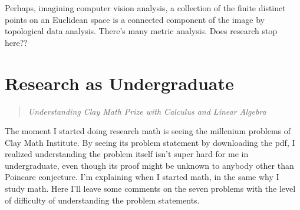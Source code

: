 \documentclass{article}
\begin{document}
Perhaps, imagining computer vision analysis, a collection of the finite distinct points on an Euclidean space 
is a connected component of the image by topological data analysis. There's many metric analysis.
Does research stop here??






\section {Research as Undergraduate}
\begin{quote}
\textit{Understanding Clay Math Prize with Calculus and Linear Algebra}
\end{quote}

The moment I started doing research math is seeing the millenium problems of Clay Math Institute.
By seeing its problem statement by downloading the pdf, I realized understanding the problem itself isn't super hard for me in undergraduate,
even though its proof might be unknown to anybody other than Poincare conjecture.
I'm explaining when I started math, in the same why I study math.
Here I'll leave some comments on the seven problems with the level of difficulty of understanding the problem statements.
\end{document}
